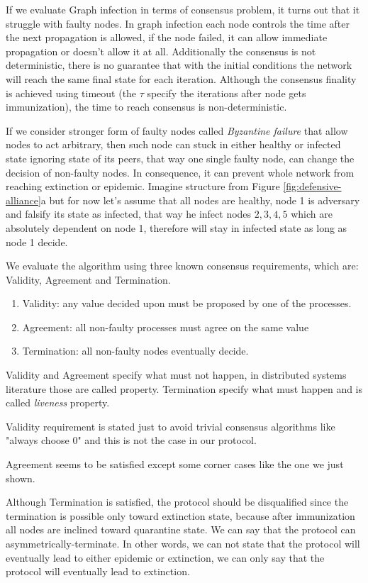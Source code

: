 \documentclass[nostrict]{szablonPG}
\begin{document}
If we evaluate Graph infection in terms of consensus problem, it turns out that it struggle with faulty nodes. In graph infection each node controls the time after the next propagation is allowed, if the node failed, it can allow immediate propagation or doesn't allow it at all. Additionally the consensus is not deterministic, there is no guarantee that with the initial conditions the network will reach the same final state for each iteration. Although the consensus finality is achieved using timeout (the $\tau$ specify the iterations after node gets immunization), the time to reach consensus is non-deterministic.

If we consider stronger form of faulty nodes called \textit{Byzantine failure}\cite{lamport2019byzantine} that allow nodes to act arbitrary, then such node can stuck in either healthy or infected state ignoring state of its peers, that way one single faulty node, can change the decision of non-faulty nodes. In consequence, it can prevent whole network from reaching extinction or epidemic. Imagine structure from Figure \ref{fig:defensive-alliance}a but for now let's assume that all nodes are healthy, node 1 is adversary and falsify its state as infected, that way he infect nodes ${2,3,4,5}$ which are absolutely dependent on node 1, therefore will stay in infected state as long as node 1 decide. 

We evaluate the algorithm using three known consensus requirements, which are: Validity, Agreement and Termination.
\begin{enumerate}
    \item Validity: any value decided upon must be proposed by one of the processes.
    \item Agreement: all non-faulty processes must agree on the same value
    \item Termination: all non-faulty nodes eventually decide.
\end{enumerate}
Validity and Agreement specify what must not happen, in distributed systems literature\cite{lamport1977proving} those are called  property. Termination specify what must happen and is called \textit{liveness} property.

Validity requirement is stated just to avoid trivial consensus algorithms like "always choose 0" and this is not the case in our protocol.

Agreement seems to be satisfied except some corner cases like the one we just shown.

Although Termination is satisfied, the protocol should be disqualified since the termination is possible only toward extinction state, because after immunization all nodes are inclined toward quarantine state. We can say that the protocol can asymmetrically-terminate. In other words, we can not state that the protocol will eventually lead to either epidemic or extinction, we can only say that the protocol will eventually lead to extinction.
\end{document}
